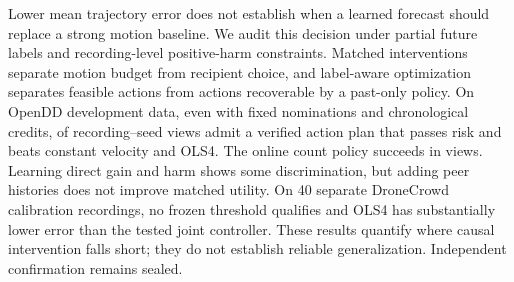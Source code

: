 Lower mean trajectory error does not establish when a learned forecast
should replace a strong motion baseline. We audit this decision under
partial future labels and recording-level positive-harm constraints.
Matched interventions separate motion budget from recipient choice,
and label-aware optimization separates feasible actions from actions
recoverable by a past-only policy. On OpenDD development data, even
with fixed nominations and chronological credits, \DirectCountStrict{}
of \DirectCountViews{} recording--seed views admit a verified action
plan that passes risk and beats constant velocity and OLS4. The online
count policy succeeds in \DirectCountCount{} views. Learning direct
gain and harm shows some discrimination, but adding peer histories
does not improve matched utility. On 40 separate DroneCrowd calibration
recordings, no frozen threshold qualifies and OLS4 has substantially
lower error than the tested joint controller. These results quantify
where causal intervention falls short; they do not establish reliable
generalization. Independent confirmation remains sealed.
